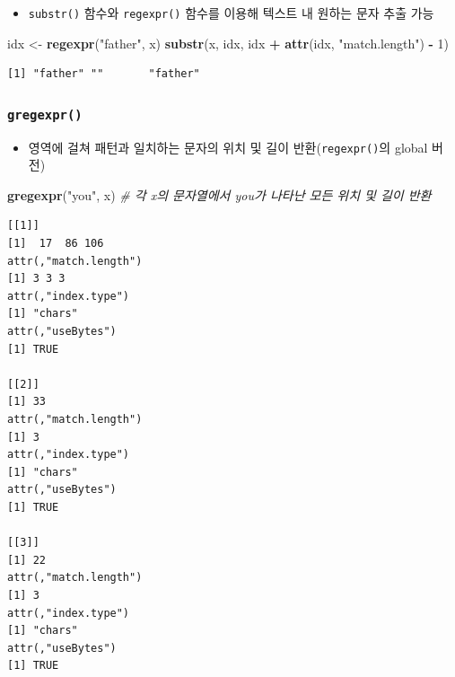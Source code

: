 \documentclass[
  11pt,
]{krantz}
\newenvironment{Shaded}{\begin{snugshade}}{\end{snugshade}}
\newcommand{\CommentTok}[1]{\textcolor[rgb]{0.37,0.37,0.37}{\textit{#1}}}
\newcommand{\DecValTok}[1]{\textcolor[rgb]{0.06,0.06,0.06}{#1}}
\newcommand{\KeywordTok}[1]{\textcolor[rgb]{0.27,0.27,0.27}{\textbf{#1}}}
\newcommand{\NormalTok}[1]{#1}
\newcommand{\OperatorTok}[1]{\textcolor[rgb]{0.43,0.43,0.43}{\textbf{#1}}}
\newcommand{\StringTok}[1]{\textcolor[rgb]{0.5,0.5,0.5}{#1}}
\providecommand{\tightlist}{%
  \setlength{\itemsep}{0pt}\setlength{\parskip}{0pt}}
\begin{document}
\begin{itemize}
\tightlist
\item
  \texttt{substr()} 함수와 \texttt{regexpr()} 함수를 이용해 텍스트 내 원하는 문자 추출 가능
\end{itemize}

\footnotesize

\begin{Shaded}
\begin{Highlighting}[]
\NormalTok{idx <-}\StringTok{ }\KeywordTok{regexpr}\NormalTok{(}\StringTok{"father"}\NormalTok{, x)}
\KeywordTok{substr}\NormalTok{(x, idx, idx }\OperatorTok{+}\StringTok{ }\KeywordTok{attr}\NormalTok{(idx, }\StringTok{"match.length"}\NormalTok{) }\OperatorTok{-}\StringTok{ }\DecValTok{1}\NormalTok{)}
\end{Highlighting}
\end{Shaded}

\begin{verbatim}
[1] "father" ""       "father"
\end{verbatim}

\normalsize

\hypertarget{gregexpr}{%
\subsubsection*{\texorpdfstring{\textbf{\texttt{gregexpr()}}}{gregexpr()}}\label{gregexpr}}


\begin{itemize}
\tightlist
\item
  영역에 걸쳐 패턴과 일치하는 문자의 위치 및 길이 반환(\texttt{regexpr()}의 global 버전)
\end{itemize}

\footnotesize

\begin{Shaded}
\begin{Highlighting}[]
\KeywordTok{gregexpr}\NormalTok{(}\StringTok{"you"}\NormalTok{, x) }\CommentTok{# 각 x의 문자열에서 you가 나타난 모든 위치 및 길이 반환}
\end{Highlighting}
\end{Shaded}

\begin{verbatim}
[[1]]
[1]  17  86 106
attr(,"match.length")
[1] 3 3 3
attr(,"index.type")
[1] "chars"
attr(,"useBytes")
[1] TRUE

[[2]]
[1] 33
attr(,"match.length")
[1] 3
attr(,"index.type")
[1] "chars"
attr(,"useBytes")
[1] TRUE

[[3]]
[1] 22
attr(,"match.length")
[1] 3
attr(,"index.type")
[1] "chars"
attr(,"useBytes")
[1] TRUE
\end{verbatim}
\end{document}
